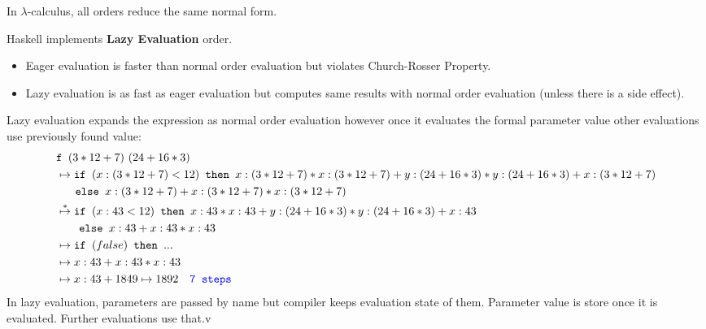 \noindent In $\lambda$-calculus, all orders reduce the same normal form.
\begin{center}
  

\end{center}

\noindent Haskell implements \textbf{Lazy Evaluation} order.
\begin{itemize}
  \item Eager evaluation is faster than normal order evaluation but violates Church-Rosser Property.
  \item Lazy evaluation is as fast as eager evaluation but computes same results with normal order evaluation (unless there is a side effect).
\end{itemize}
Lazy evaluation expands the expression as normal order evaluation however once it evaluates the formal parameter value other evaluations use previously found value:
\begin{align*}
  &\texttt{f } (3*12 + 7)\ (24 + 16*3)\\
  &\mapsto \texttt{if } (x:(3*12 + 7) < 12) \texttt{ then } x:(3*12 + 7) * x:(3*12 + 7) + y:(24 + 16*3) * y:(24 + 16*3) + x:(3*12+7)\\
  &\quad\ \ \texttt{else } x:(3*12 + 7) + x:(3*12 + 7) * x:(3*12 + 7)\\
  &\stackrel{*}{\mapsto} \texttt{if } (x:43 < 12) \texttt{ then } x:43 * x:43 + y:(24 + 16*3) * y:(24 + 16*3) + x:43\\
  &\quad\ \ \ \texttt{else } x:43 + x:43 * x:43\\
  &\mapsto \texttt{if } (false) \texttt{ then } ...\\
  &\mapsto x:43 + x:43 * x:43\\
  &\mapsto x:43 + 1849 \mapsto 1892 \quad \texttt{\textcolor{blue}{7 steps}}
\end{align*}
In lazy evaluation, parameters are passed by name but compiler keeps evaluation state of them. Parameter value is store once it is evaluated. Further evaluations use that.v

